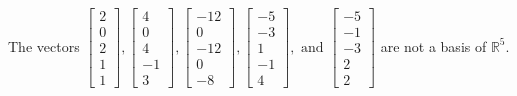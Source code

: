 \begin{exercise}
\begin{exerciseStatement}
  \end{exerciseStatement}
  \begin{exerciseAnswer}
   The vectors \(\left[\begin{array}{r}
2 \\
0 \\
2 \\
1 \\
1
\end{array}\right] , \left[\begin{array}{r}
4 \\
0 \\
4 \\
-1 \\
3
\end{array}\right] , \left[\begin{array}{r}
-12 \\
0 \\
-12 \\
0 \\
-8
\end{array}\right] , \left[\begin{array}{r}
-5 \\
-3 \\
1 \\
-1 \\
4
\end{array}\right] , \text{ and } \left[\begin{array}{r}
-5 \\
-1 \\
-3 \\
2 \\
2
\end{array}\right]\) 
  	 are not  a basis of \(\mathbb{R}^5\).
  


  \end{exerciseAnswer}
\end{exercise}